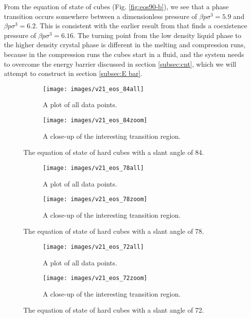 \documentclass[thesis]{subfiles}
\begin{document}
From the equation of state of cubes (Fig. \ref{fig:eos90-b}), we see that a phase transition occurs somewhere between a dimensionless pressure of $\beta p \sigma^3 = 5.9$ and $\beta p \sigma^3 = 6.2$. This is consistent with the earlier result from \cite{smallenburg2012vacancy} that finds a coexistence pressure of $\beta p \sigma^3 = 6.16$. The turning point from the low density liquid phase to the higher density crystal phase is different in the melting and compression runs, because in the compression runs the cubes start in a fluid, and the system needs to overcome the energy barrier discussed in section \ref{subsec:cnt}, which we will attempt to construct in section \ref{subsec:E bar}.

\begin{figure}[h]
	\begin{subfigure}[t]{0.475\textwidth}
		\texttt{[image: images/v21\_eos\_84all]}
		\caption{A plot of all data points.}
		\label{fig:eos84-a}
	\end{subfigure}\hfill
	\begin{subfigure}[t]{0.475\textwidth}
		\texttt{[image: images/v21\_eos\_84zoom]}
		\caption{A close-up of the interesting transition region.}
		\label{fig:eos84-b}
	\end{subfigure}
	\caption{The equation of state of hard cubes with a slant angle of 84\degr.}
	\label{fig:eos84}
\end{figure}

\begin{figure}[h]
	\begin{subfigure}[t]{0.475\textwidth}
		\texttt{[image: images/v21\_eos\_78all]}
		\caption{A plot of all data points.}
		\label{fig:eos78-a}
	\end{subfigure}\hfill
	\begin{subfigure}[t]{0.475\textwidth}
		\texttt{[image: images/v21\_eos\_78zoom]}
		\caption{A close-up of the interesting transition region.}
		\label{fig:eos78-b}
	\end{subfigure}
	\caption{The equation of state of hard cubes with a slant angle of 78\degr.}
	\label{fig:eos78}
\end{figure}

\begin{figure}[h]
	\begin{subfigure}[t]{0.475\textwidth}
		\texttt{[image: images/v21\_eos\_72all]}
		\caption{A plot of all data points.}
		\label{fig:eos72-a}
	\end{subfigure}\hfill
	\begin{subfigure}[t]{0.475\textwidth}
		\texttt{[image: images/v21\_eos\_72zoom]}
		\caption{A close-up of the interesting transition region.}
		\label{fig:eos72-b}
	\end{subfigure}
	\caption{The equation of state of hard cubes with a slant angle of 72\degr.}
	\label{fig:eos72}
\end{figure}
\end{document}
